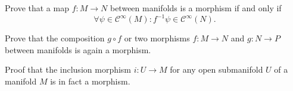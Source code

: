 \begin{xca}
  Prove that a map $f\colon M \to N$ between manifolds is a morphism if and only if
  \[
    \forall \psi \in \mathcal C^\infty(M):
    f^{-1} \psi \in \mathcal C^\infty(N).
  \]
\end{xca}

\begin{xca}
  Prove that the composition $g \circ f$ or two morphisms $f\colon M \to N$
  and $g\colon N \to P$ between manifolds is again a morphism.
\end{xca}

\begin{xca}
  Proof that the inclusion morphism $i\colon U \to M$ for any open submanifold
  $U$ of a manifold $M$ is in fact a morphism.
\end{xca}

